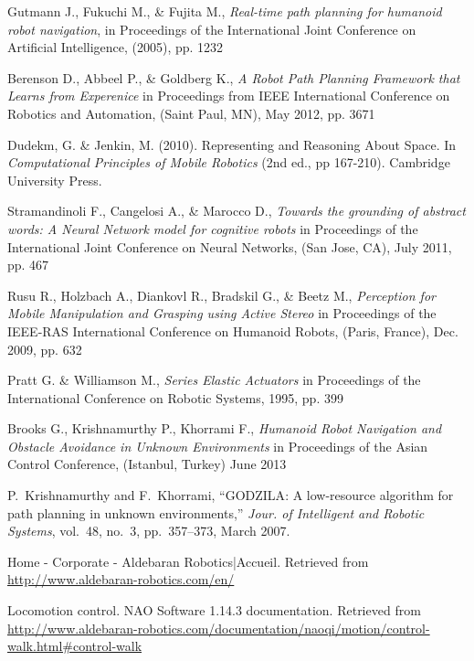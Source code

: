 \begin{thebibliography}{99}
    Gutmann J., Fukuchi M., \& Fujita M.,
    \emph{Real-time path planning for humanoid robot navigation},
    in Proceedings of the International Joint Conference on Artificial Intelligence,
    (2005),
    pp. 1232

	Berenson D., Abbeel P., \& Goldberg K.,
	\emph{A Robot Path Planning Framework that Learns from Experenice}
	in Proceedings from IEEE International Conference on Robotics and Automation,
	(Saint Paul, MN),
	May 2012,
	pp. 3671

	Dudekm, G. \& Jenkin, M. (2010).
	Representing and Reasoning About Space.
	In \emph{Computational Principles of Mobile Robotics}
	(2nd ed., pp 167-210).
	Cambridge University Press.


	Stramandinoli F., Cangelosi A., \& Marocco D.,
	\emph{Towards the grounding of abstract words: A Neural Network model for cognitive robots}
	in Proceedings of the International Joint Conference on Neural Networks,
	(San Jose, CA),
	July 2011,
	pp. 467

	Rusu R., Holzbach A., Diankovl R., Bradskil G., \& Beetz M.,
	\emph{Perception for Mobile Manipulation and Grasping using Active Stereo}
	in Proceedings of the IEEE-RAS International Conference on Humanoid Robots,
	(Paris, France),
	Dec. 2009,
	pp. 632

	Pratt G. \& Williamson M.,
	\emph{Series Elastic Actuators}
	in Proceedings of the International Conference on Robotic Systems,
	1995,
	pp. 399

	Brooks G., Krishnamurthy P., Khorrami F.,
	\emph{Humanoid Robot Navigation and Obstacle Avoidance in Unknown Environments}
	in Proceedings of the Asian Control Conference,
	(Istanbul, Turkey)
	June 2013

	P.~Krishnamurthy and F.~Khorrami, 
	``{GODZILA}: A low-resource algorithm for path planning in unknown environments,'' 
	\emph{Jour. of Intelligent and Robotic Systems}, 
	vol.~48, no.~3, pp.~357--373, March 2007.

	Home - Corporate - Aldebaran Robotics|Accueil.
	Retrieved from \url{http://www.aldebaran-robotics.com/en/}

   	Locomotion control. 
   	NAO Software 1.14.3 documentation. 
   	Retrieved from \url{http://www.aldebaran-robotics.com/documentation/naoqi/motion/control-walk.html#control-walk}


\end{thebibliography}
